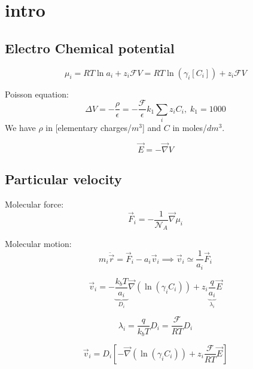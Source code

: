 \documentclass[aps,12pt]{revtex4}
\begin{document}
\section{intro}

\subsection{Electro Chemical potential}

\begin{equation}
	\mu_i = RT \ln a_i + z_i \mathcal{F} V = RT \ln (\gamma_i[C_i]) + z_i \mathcal{F} V
\end{equation}

Poisson equation:
\begin{equation}
	\Delta V = - \dfrac{\rho}{\epsilon} = -\dfrac{\mathcal{F}}{\epsilon} k_1 \sum_i z_i C_i,\;k_1=1000
\end{equation}
We have $\rho$ in [elementary charges/$m^3$] and $C$ in moles/$dm^3$.

\begin{equation}
	\vec{E} = -\vec{\nabla} V
\end{equation}

\subsection{Particular velocity}
Molecular force:	
\begin{equation}
	\vec{F}_i = - \frac{1}{\mathcal{N}_A} \vec{\nabla} \mu_i
\end{equation}

Molecular motion:
\begin{equation}
	m_i \ddot {\vec{r}} = \vec{F}_i - a_i \vec{v}_i \implies \vec{v}_i \simeq \dfrac{1}{a_i} \vec{F}_i
\end{equation}

\begin{equation}
	\vec{v}_i = -\underbrace{\dfrac{k_bT}{a_i}}_{D_i} \vec{\nabla}(\ln(\gamma_i C_i))  + z_i \underbrace{\dfrac{ q}{a_i}}_{\lambda_i} \vec{E}
\end{equation}

\begin{equation}
	\lambda_i = \frac{q}{k_bT} D_i = \dfrac{\mathcal{F}}{RT} D_i
\end{equation}

\begin{equation}
\boxed{
	\vec{v}_i = D_i \left[ - \vec{\nabla}(\ln(\gamma_i C_i)) + z_i \dfrac{\mathcal{F}}{RT} \vec{E} \right]
}
\end{equation}
\end{document}
